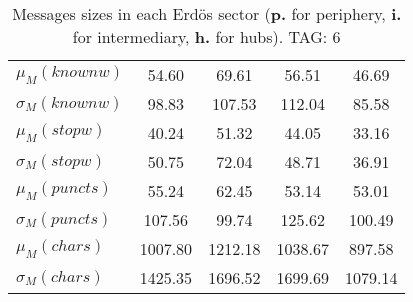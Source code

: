 \begin{table}[h!]
\begin{center}
\begin{tabular}{| l || c | c | c | c |}
$\mu_M(knownw)$ & 54.60  & 69.61  & 56.51  & 46.69 \\
$\sigma_M(knownw)$ & 98.83  & 107.53  & 112.04  & 85.58 \\\hline
$\mu_M(stopw)$ & 40.24  & 51.32  & 44.05  & 33.16 \\
$\sigma_M(stopw)$ & 50.75  & 72.04  & 48.71  & 36.91 \\\hline
$\mu_M(puncts)$ & 55.24  & 62.45  & 53.14  & 53.01 \\
$\sigma_M(puncts)$ & 107.56  & 99.74  & 125.62  & 100.49 \\\hline
$\mu_M(chars)$ & 1007.80  & 1212.18  & 1038.67  & 897.58 \\
$\sigma_M(chars)$ & 1425.35  & 1696.52  & 1699.69  & 1079.14 \\\hline
\end{tabular}
\caption{Messages sizes in each Erd\"os sector ({{\bf p.}} for periphery, {{\bf i.}} for intermediary, {{\bf h.}} for hubs). TAG: 6}
\end{center}
\end{table}